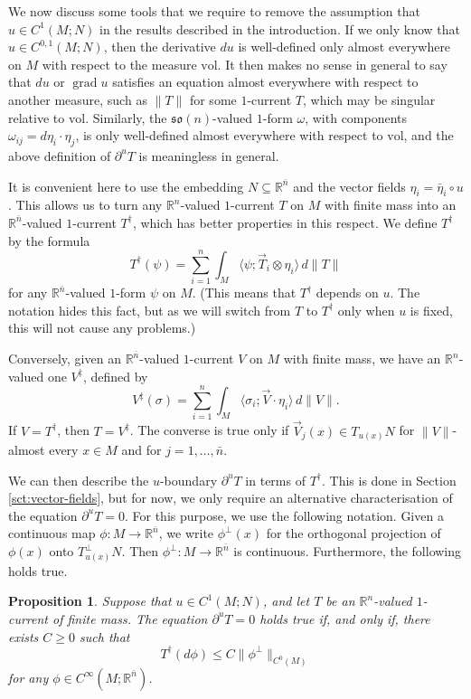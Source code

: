 \documentclass[a4paper]{article}
\newcommand{\R}{\mathbb{R}}
\newcommand{\vol}{\mathrm{vol}}
\newcommand{\ndim}{{\bar{n}}}
\DeclareMathOperator{\grad}{grad}
\newcommand{\so}{\mathfrak{so}}
\newcommand{\pairing}[2]{\langle #1; #2 \rangle}
\newtheorem{proposition}[theorem]{Proposition}
\theoremstyle{definition}
\theoremstyle{remark}
\begin{document}
We now discuss some tools that we require to remove the assumption that
$u \in C^1(M; N)$ in the results
described in the introduction. If we only know that $u \in C^{0, 1}(M; N)$, then the derivative $du$ is well-defined only almost everywhere on $M$ with respect to the measure $\vol$. It then makes no sense in general to say that $du$
or $\grad u$ satisfies an equation
almost everywhere with respect to another measure, such as $\|T\|$ for some $1$-current $T$, which may be singular relative to $\vol$.
Similarly, the $\so(n)$-valued $1$-form $\omega$, with components $\omega_{ij} = d\eta_i \cdot \eta_j$, is only well-defined almost everywhere with respect to $\vol$, and the above definition of $\partial^u T$ is meaningless in general.

It is convenient here to use the embedding $N \subseteq \R^\ndim$ and the vector fields $\eta_i = \bar{\eta}_i \circ u$.
This allows us to turn any $\R^n$-valued $1$-current $T$ on $M$ with finite mass
into an $\R^\ndim$-valued $1$-current $T^\dagger$, which has better properties in this respect. We define $T^\dagger$ by the formula
\[
T^\dagger(\psi) = \sum_{i = 1}^n \int_M \pairing{\psi}{\vec{T}_i \otimes \eta_i} \, d\|T\|
\]
for any $\R^\ndim$-valued $1$-form $\psi$ on $M$. (This means that $T^\dagger$ depends on $u$. The notation hides this fact, but as we will switch from $T$ to $T^\dagger$ only when $u$ is fixed, this will not cause any problems.)

Conversely, given an $\R^\ndim$-valued $1$-current $V$ on $M$ with finite mass, we have an $\R^n$-valued one $V^\ddagger$, defined by
\[
V^\ddagger(\sigma) = \sum_{i = 1}^n \int_M \pairing{\sigma_i}{\vec{V} \cdot \eta_i} \, d\|V\|.
\]
If $V = T^\dagger$, then $T = V^\ddagger$. The converse is true only if
$\vec{V}_j(x) \in T_{u(x)} N$ for $\|V\|$-almost every $x \in M$ and for
$j = 1, \dotsc, \ndim$.

We can then describe the $u$-boundary $\partial^u T$ in terms of $T^\dagger$. This is done in Section \ref{sct:vector-fields},
but for now, we only require an alternative characterisation of the equation $\partial^u T = 0$.
For this purpose, we use the following notation. Given a continuous map $\phi \colon M \to \R^\ndim$, we write $\phi^\perp(x)$ for the
orthogonal projection of $\phi(x)$ onto $T_{u(x)}^\perp N$. Then $\phi^\perp \colon M \to \R^\ndim$ is continuous.
Furthermore, the following holds true.

\begin{proposition} \label{prp:u-boundary}
Suppose that $u \in C^1(M; N)$, and let $T$ be an $\R^n$-valued $1$-current of finite mass. The equation
$\partial^u T = 0$ holds true if, and only if, there exists $C \ge 0$ such that
\begin{equation} \label{eq:vanishing-boundary-weak}
T^\dagger(d\phi) \le C \|\phi^\perp\|_{C^0(M)}
\end{equation}
for any $\phi \in C^\infty(M; \R^\ndim)$.
\end{proposition}
\end{document}

